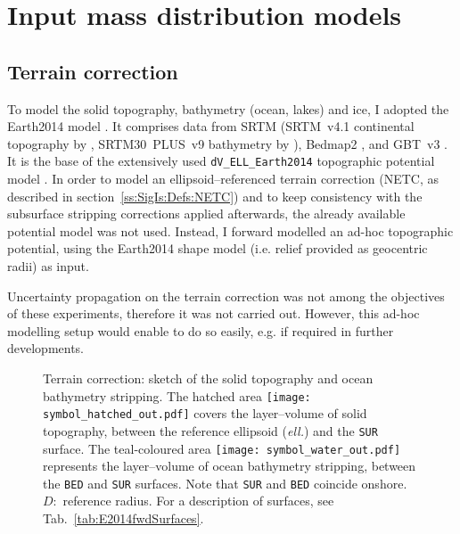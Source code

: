 \section{Input mass distribution models}
\label{s:SigIs:InModels}

\subsection{Terrain correction}
\label{ss:SigIs:InModels:TC}
To model the solid topography, bathymetry (ocean, lakes) and ice, I adopted the {Earth2014} model \parencite{Hirt2015}.
It comprises data from SRTM (SRTM~v4.1 continental topography by \cite{Jarvis2008_SRTM4}, SRTM30~PLUS~v9 bathymetry by \cite{Becker_SRTM30plus}), Bedmap2 \parencite{Fretwell2013_Bedmap}, and GBT~v3 \parencite{Bamber2013_GBT}.
It is the base of the extensively used \verb|dV_ELL_Earth2014| topographic potential model \parencite{Rexer2016}.
In order to model an ellipsoid--referenced terrain correction (NETC, as described in section~\ref{ss:SigIs:Defs:NETC}) and to keep consistency with the subsurface stripping corrections applied afterwards, the already available potential model was not used.
Instead, I forward modelled an ad-hoc topographic potential, using the {Earth2014} shape model (i.e. relief provided as geocentric radii) as input.

Uncertainty propagation on the terrain correction was not among the objectives of these experiments, therefore it was not carried out.
However, this ad-hoc modelling setup would enable to do so easily, e.g. if required in further developments.

\begin{figure}
    \begin{adjustbox}{center}
    \end{adjustbox}
    \caption[Terrain correction: sketch of the solid topography and ocean bathymetry stripping.]{
        Terrain correction: sketch of the solid topography and ocean bathymetry stripping.
        The hatched area 
            \texttt{[image: symbol\_hatched\_out.pdf]}
        covers the layer--volume of solid topography, between the reference ellipsoid (\textit{ell.}) and the \texttt{SUR} surface.
        The teal-coloured area 
            \texttt{[image: symbol\_water\_out.pdf]}
        represents the layer--volume of ocean bathymetry stripping, between the \texttt{BED} and \texttt{SUR} surfaces. Note that \texttt{SUR} and \texttt{BED} coincide onshore.
        $D$:~reference radius.
        For a description of surfaces, see Tab.~\ref{tab:E2014fwdSurfaces}.
    }
    \label{fig:E2014fwdLayersSketch}
\end{figure}

